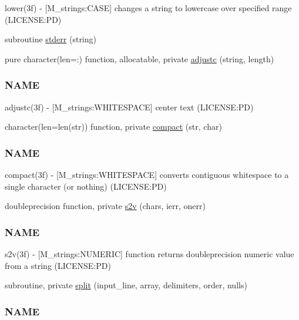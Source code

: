 \begin{DoxyCompactItemize}
\begin{DoxyCompactList}
lower(3f) -\/ \mbox{[}M\+\_\+strings\+:C\+A\+SE\mbox{]} changes a string to lowercase over specified range (L\+I\+C\+E\+N\+SE\+:PD) \end{DoxyCompactList}\item 
subroutine \mbox{\hyperlink{namespacem__time_ac729ead2b5aa4c756d52284cd7d22bf2}{stderr}} (string)
\item 
pure character(len=\+:) function, allocatable, private \mbox{\hyperlink{namespacem__time_a9b165bc2207c694474bff6c7f56dfb09}{adjustc}} (string, length)
\begin{DoxyCompactList}\small\item\em \subsubsection*{N\+A\+ME}

adjustc(3f) -\/ \mbox{[}M\+\_\+strings\+:W\+H\+I\+T\+E\+S\+P\+A\+CE\mbox{]} center text (L\+I\+C\+E\+N\+SE\+:PD) \end{DoxyCompactList}\item 
character(len=len(str)) function, private \mbox{\hyperlink{namespacem__time_a7dd8bfae3ed8ba85bf4de75bf120fe89}{compact}} (str, char)
\begin{DoxyCompactList}\small\item\em \subsubsection*{N\+A\+ME}

compact(3f) -\/ \mbox{[}M\+\_\+strings\+:W\+H\+I\+T\+E\+S\+P\+A\+CE\mbox{]} converts contiguous whitespace to a single character (or nothing) (L\+I\+C\+E\+N\+SE\+:PD) \end{DoxyCompactList}\item 
doubleprecision function, private \mbox{\hyperlink{namespacem__time_a30c2f29f22d676ade9dff5ad6c35aae5}{s2v}} (chars, ierr, onerr)
\begin{DoxyCompactList}\small\item\em \subsubsection*{N\+A\+ME}

s2v(3f) -\/ \mbox{[}M\+\_\+strings\+:N\+U\+M\+E\+R\+IC\mbox{]} function returns doubleprecision numeric value from a string (L\+I\+C\+E\+N\+SE\+:PD) \end{DoxyCompactList}\item 
subroutine, private \mbox{\hyperlink{namespacem__time_a16627f5dab7e40434531eed45cb3ea26}{split}} (input\+\_\+line, array, delimiters, order, nulls)
\begin{DoxyCompactList}\small\item\em \subsubsection*{N\+A\+ME}


\end{DoxyCompactList}
\end{DoxyCompactItemize}
